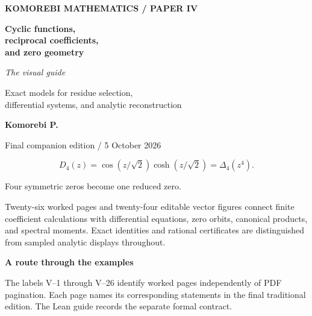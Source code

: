 \documentclass[11pt,a4paper]{article}
\begin{document}
\begin{titlepage}
\thispagestyle{empty}
\vspace*{14mm}
{\sffamily\bfseries\small\color{accent}KOMOREBI MATHEMATICS / PAPER IV}\par
\vspace{5mm}{\color{accent}\rule{\linewidth}{1pt}}\par
\vspace{12mm}
{\sffamily\bfseries\fontsize{32}{36}\selectfont Cyclic functions,\\reciprocal coefficients,\\and zero geometry\par}
\vspace{9mm}
{\fontsize{23}{28}\selectfont\itshape The visual guide\par}
\vspace{8mm}
{\large Exact models for residue selection,\\differential systems, and analytic reconstruction\par}
\vspace{15mm}
{\sffamily\bfseries Komorebi P.}\par
{\sffamily\small\color{muted}Final companion edition / 5 October 2026}\par
\vfill
{\Large\[
D_4(z)=\cos(z/\sqrt2)\cosh(z/\sqrt2)=\Delta_4(z^4).
\]}
\begin{center}\small Four symmetric zeros become one reduced zero.\end{center}
\vfill
\begin{minipage}{.96\linewidth}
Twenty-six worked pages and twenty-four editable vector figures connect
finite coefficient calculations with differential equations, zero orbits,
canonical products, and spectral moments. Exact identities and rational
certificates are distinguished from sampled analytic displays throughout.
\end{minipage}
\end{titlepage}
{\sffamily\bfseries\Large\color{accent}A route through the examples}\par\medskip
The labels V--1 through V--26 identify worked pages independently of PDF
pagination. Each page names its corresponding statements in the final
traditional edition. The Lean guide records the separate formal contract.
\medskip
\end{document}
